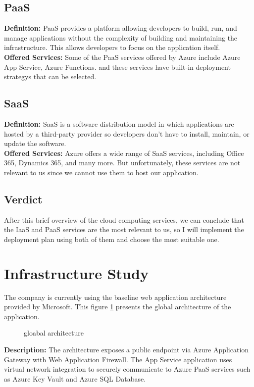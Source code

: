 \subsection*{PaaS}
\noindent
\textbf{Definition:} PaaS provides a platform allowing developers to build, run, and manage applications without the complexity of building and maintaining the infrastructure. This allows developers to focus on the application itself.
\noindent \\
\textbf{Offered Services:} Some of the PaaS services offered by Azure include Azure App Service, Azure Functions. and these services have built-in deployment strategys that can be selected.
\subsection*{SaaS}
\noindent
\textbf{Definition:} SaaS is a software distribution model in which applications are hosted by a third-party provider so developers don't have to install, maintain, or update the software.
\noindent \\
\textbf{Offered Services:} Azure offers a wide range of SaaS services, including Office 365, Dynamics 365, and many more. But unfortunately, these services are not relevant to us since we cannot use them to host our application.
\subsection*{Verdict}
After this brief overview of the cloud computing services, we can conclude that the IaaS and PaaS services are the most relevant to us, so I will implement the deployment plan using both of them and choose the most suitable one.
\section{Infrastructure Study}
The company is currently using the baseline web application architecture provided by Microsoft\cite{webArticle6}.
This figure \ref{fig:gloabal_architecture} presents the global architecture of the application.

\begin{figure}[htpb]
    \centering
    \caption{gloabal architecture}
    \label{fig:gloabal_architecture}
\end{figure}

\noindent \textbf{Description:} The architecture exposes a public endpoint via Azure Application Gateway with Web Application Firewall. The App Service application uses virtual network integration to securely communicate to Azure PaaS services such as Azure Key Vault and Azure SQL Database.

